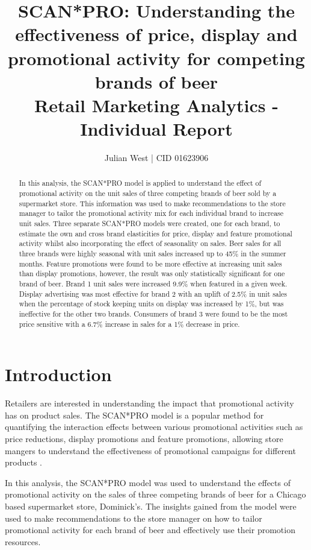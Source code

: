 \documentclass[a4paper,11pt]{article}
\title{SCAN*PRO: Understanding the effectiveness of price, display and promotional activity for competing brands of beer  \\
\addlinespace
\large Retail Marketing Analytics - Individual Report}
\author{Julian West | CID 01623906}
\begin{document}
\maketitle
\begin{abstract}
In this analysis, the SCAN*PRO model is applied to understand the effect of promotional activity on the unit sales of three competing brands of beer sold by a supermarket store. This information was used to make recommendations to the store manager to tailor the promotional activity mix for each individual brand to increase unit sales. Three separate SCAN*PRO models were created, one for each brand, to estimate the own and cross brand elasticities for price, display and feature promotional activity whilst also incorporating the effect of seasonality on sales. Beer sales for all three brands were highly seasonal with unit sales increased up to 45\% in the summer months. Feature promotions were found to be more effective at increasing unit sales than display promotions, however, the result was only statistically significant for one brand of beer. Brand 1 unit sales were increased 9.9\% when featured in a given week. Display advertising was most effective for brand 2 with an uplift of 2.5\% in unit sales when the percentage of stock keeping units on display was increased by 1\%, but was ineffective for the other two brands. Consumers of brand 3 were found to be the most price sensitive with a 6.7\% increase in sales for a 1\% decrease in price. 

\end{abstract} \hspace{50pt}

\newpage
\tableofcontents
\newpage

\section{Introduction}
Retailers are interested in understanding the impact that promotional activity has on product sales. The SCAN*PRO model \citep{wittink_estimation_1988} is a popular method for quantifying the interaction effects between various promotional activities such as price reductions, display promotions and feature promotions, allowing store mangers to understand the effectiveness of promotional campaigns for different products \citep{andrews_estimating_2008, srinivasan_promotions_2004}. 

In this analysis, the SCAN*PRO model was used to understand the effects of promotional activity on the sales of three competing brands of beer for a Chicago based supermarket store, Dominick's. The insights gained from the model were used to make recommendations to the store manager on how to tailor promotional activity for each brand of beer and effectively use their promotion resources.
\end{document}

